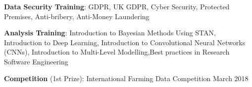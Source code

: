 \documentclass[letter,10pt]{article}
\begin{document}
\textbf{Data Security Training}: GDPR, UK GDPR, Cyber Security, Protected Premises, Anti-bribery, Anti-Money Laundering

\textbf{Analysis Training}: 
Introduction to Bayesian Methods Using STAN, 
Introduction to Deep Learning,
Introduction to Convolutional Neural Networks (CNNs), 
Introduction to Multi-Level Modelling,Best practices in 
Research Software Engineering 

\textbf{Competition} (1st Prize): International Farming Data Competition \hfill March 2018
\end{document}
